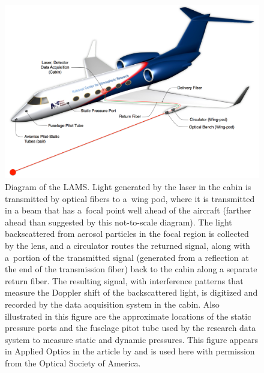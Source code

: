 \documentclass[12pt,twoside,english]{article}\usepackage[]{graphicx}\usepackage[]{color}
\begin{document}
\begin{figure}%
\noindent \begin{centering}%
\includegraphics[width=0.9\columnwidth]{SpecialGraphics/amt-2014-0031-f01.png}%
\caption[Diagram showing the LAMS as operated on the GV.]{Diagram of the LAMS. Light generated by the laser in the cabin is transmitted by optical fibers to a~wing pod, where it is transmitted in a beam that has a~focal point well ahead of the aircraft (farther ahead than suggested by this not-to-scale diagram). The light backscattered from aerosol particles in the focal region is collected by the lens, and a circulator routes the returned signal, along with a~portion of the transmitted signal (generated from a reflection at the end of the transmission fiber) back to the cabin along a separate return fiber. The resulting signal, with interference patterns that measure the Doppler shift of the backscattered light, is digitized and recorded by the data acquisition system in the cabin. Also illustrated in this figure are the approximate locations of the static pressure ports and the fuselage pitot tube used by the research data system to measure static and dynamic pressures. This figure appears in Applied Optics in the article by \citet{SpulerEtAl2011} and is used here with permission from the Optical Society of America.\label{fig:LAMSschematic}}%
\end{centering}%
\end{figure}%
\end{document}
